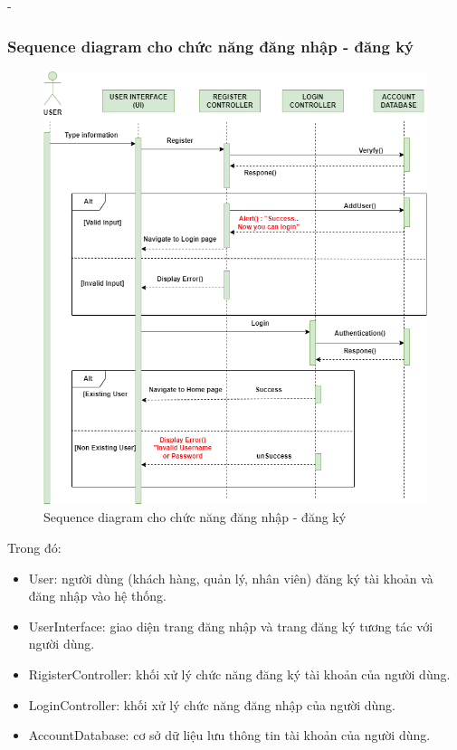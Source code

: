\begin {list} {-}{}
\subsubsection{Sequence diagram cho chức năng đăng nhập - đăng ký}
\begin{figure}[h]
    \centering
    \includegraphics[scale=0.6]{images/hieu/chap-3/login-signup-sequence-diagram.png}
    \caption{Sequence diagram cho chức năng đăng nhập - đăng ký}
\end{figure}
Trong đó:
\begin{itemize}
    \item User: người dùng (khách hàng, quản lý, nhân viên) đăng ký tài khoản và đăng nhập vào hệ thống.
    \item UserInterface: giao diện trang đăng nhập và trang đăng ký tương tác với người dùng.
    \item RigisterController: khối xử lý chức năng đăng ký tài khoản của người dùng.
    \item LoginController: khối xử lý chức năng đăng nhập của người dùng.
    \item AccountDatabase: cơ sở dữ liệu lưu thông tin tài khoản của người dùng.
\end{itemize}
\newpage

\end{list}
